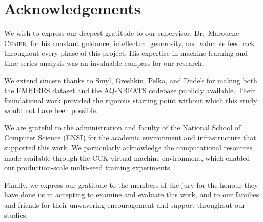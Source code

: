 \chapter*{Acknowledgements}

\vspace{1cm}

\noindent
We wish to express our deepest gratitude to our supervisor, Dr.\ Marouene
\textsc{Chaieb}, for his constant guidance, intellectual generosity, and
valuable feedback throughout every phase of this project. His expertise in
machine learning and time-series analysis was an invaluable compass for
our research.

\vspace{0.4cm}

\noindent
We extend sincere thanks to Smyl, Oreshkin, Pelka, and Dudek for making
both the EMHIRES dataset and the AQ-NBEATS codebase publicly available.
Their foundational work provided the rigorous starting point without which
this study would not have been possible.

\vspace{0.4cm}

\noindent
We are grateful to the administration and faculty of the National School
of Computer Science (ENSI) for the academic environment and infrastructure
that supported this work. We particularly acknowledge the computational
resources made available through the CCK virtual machine environment, which
enabled our production-scale multi-seed training experiments.

\vspace{0.4cm}

\noindent
Finally, we express our gratitude to the members of the jury for the honour
they have done us in accepting to examine and evaluate this work, and to our
families and friends for their unwavering encouragement and support throughout
our studies.

